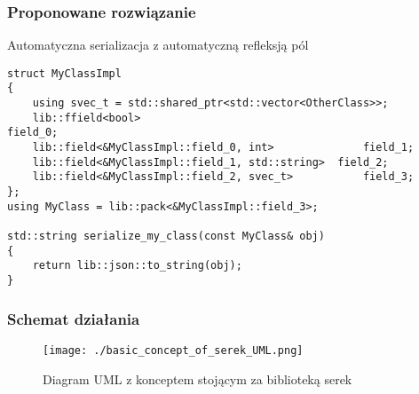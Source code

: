 \documentclass[12pt]{beamer}
\begin{document}
	\begin{frame}[fragile]
		\frametitle{Proponowane rozwiązanie}

		Automatyczna serializacja z automatyczną refleksją pól\newline

		\begin{lstlisting}[frame=single]
struct MyClassImpl
{
	using svec_t = std::shared_ptr<std::vector<OtherClass>>;
	lib::ffield<bool>											field_0;
	lib::field<&MyClassImpl::field_0, int>				field_1;
	lib::field<&MyClassImpl::field_1, std::string> 	field_2;
	lib::field<&MyClassImpl::field_2, svec_t>			field_3;
};
using MyClass = lib::pack<&MyClassImpl::field_3>;

std::string serialize_my_class(const MyClass& obj)
{
	return lib::json::to_string(obj);
}
		\end{lstlisting}

	\end{frame}

	\begin{frame}
		\frametitle{Schemat działania}

		\begin{figure}[ht!]
			\centering
			\texttt{[image: ./basic\_concept\_of\_serek\_UML.png]}
			\caption{Diagram UML z konceptem stojącym za biblioteką serek}
		\end{figure}

	\end{frame}
\end{document}
